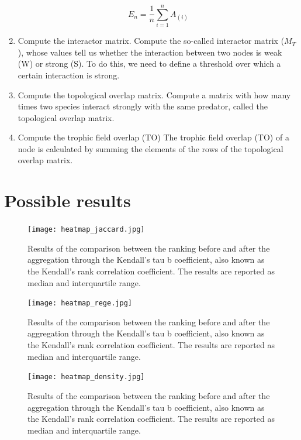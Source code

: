 \documentclass[twocolumn]{article}
\begin{document}
\begin{appendices}
\begin{enumerate}
					\begin{equation}
						E_n=\frac{1}{n}\sum_{i=1}^{n}A_{\left(i\right)}
					\end{equation}

			\item Compute the interactor matrix.
					Compute the so-called interactor matrix ($M_T$), whose values tell us whether the interaction between two nodes is weak (W) or strong (S).
					To do this, we need to define a threshold over which a certain interaction is strong.
		  \item Compute the topological overlap matrix.
					Compute a matrix with how many times two species interact strongly with the same predator, called the topological overlap matrix.
		  \item Compute the trophic field overlap (TO)
					The trophic field overlap (TO) of a node is calculated by summing the elements of the rows of the topological overlap matrix.
		\end{enumerate}

	\section{Possible results}

		\begin{figure}[b]%
			\centering
			\texttt{[image: heatmap\_jaccard.jpg]}
			\caption{Results of the comparison between the ranking before and after the aggregation through the Kendall's tau b coefficient, also known as the Kendall's rank correlation coefficient. The results are reported as median and interquartile range.} \label{fig:jaccard_results}
		\end{figure}

		\begin{figure}[b]%
			\centering
			\texttt{[image: heatmap\_rege.jpg]}
			\caption{Results of the comparison between the ranking before and after the aggregation through the Kendall's tau b coefficient, also known as the Kendall's rank correlation coefficient. The results are reported as median and interquartile range.} \label{fig:rege_results}
		\end{figure}

		\begin{figure}[b]%
			\centering
			\texttt{[image: heatmap\_density.jpg]}
			\caption{Results of the comparison between the ranking before and after the aggregation through the Kendall's tau b coefficient, also known as the Kendall's rank correlation coefficient. The results are reported as median and interquartile range.} \label{fig:density_results}
		\end{figure}


\end{appendices}
\end{document}

